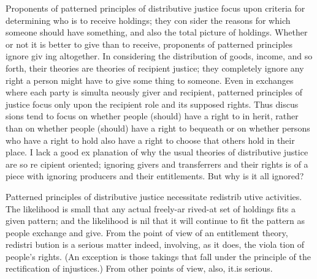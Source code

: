 \documentclass[11pt,openany]{book}
\begin{document}
Proponents of patterned principles of distributive justice focus upon criteria for determining who is to receive holdings; they con sider the reasons for which someone should have something, and also the total picture of holdings. Whether or not it is better to give than to receive, proponents of patterned principles ignore giv ing altogether. In considering the distribution of goods, income, and so forth, their theories are theories of recipient justice; they completely ignore any right a person might have to give some thing to someone. Even in exchanges where each party is simulta neously giver and recipient, patterned principles of justice focus only upon the recipient role and its supposed rights. Thus discus sions tend to focus on whether people (should) have a right to in herit, rather than on whether people (should) have a right to bequeath or on whether persons who have a right to hold also have a right to choose that others hold in their place. I lack a good ex planation of why the usual theories of distributive justice are so re cipient oriented; ignoring givers and transferrers and their rights is of a piece with ignoring producers and their entitlements. But why is it all ignored? 

Patterned principles of distributive justice necessitate redistrib utive activities. The likelihood is small that any actual freely-ar rived-at set of holdings fits a given pattern; and the likelihood is nil that it will continue to fit the pattern as people exchange and give. From the point of view of an entitlement theory, redistri bution is a serious matter indeed, involving, as it does, the viola tion of people's rights. (An exception is those takings that fall under the principle of the rectification of injustices.) From other points of view, also, it.is serious. 
\end{document}
